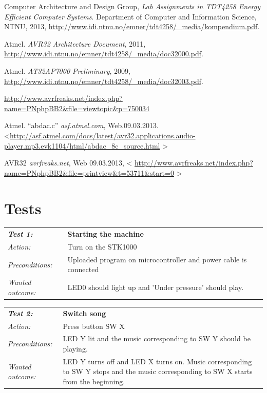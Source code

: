 \documentclass[a4paper,12pt]{article}
\begin{document}
\begin{thebibliography}{9}

Computer Architecture and Design Group,
\emph{Lab Assignments in TDT4258 Energy Efficient Computer Systems}.
Department of Computer and Information Science, NTNU,
2013,
\url{http://www.idi.ntnu.no/emner/tdt4258/\_media/kompendium.pdf}.

Atmel.
\emph{AVR32 Architecture Document},
2011,
\url{http://www.idi.ntnu.no/emner/tdt4258/\_media/doc32000.pdf}.

Atmel.
\emph{AT32AP7000 Preliminary},
2009,
\url{http://www.idi.ntnu.no/emner/tdt4258/\_media/doc32003.pdf}.

\url{http://www.avrfreaks.net/index.php?name=PNphpBB2&file=viewtopic&p=750034}

Atmel. “abdac.c”
\emph{asf.atmel.com},
Web.09.03.2013.
\textless \url{http://asf.atmel.com/docs/latest/avr32.applications.audio-player.mp3.evk1104/html/abdac_8c_source.html}
\textgreater

AVR32
\emph{avrfreaks.net},
Web 09.03.2013,
\textless
\url{http://www.avrfreaks.net/index.php?name=PNphpBB2&file=printview&t=53711&start=0}
\textgreater

\end{thebibliography}

\clearpage
\appendix
{}
\section{Tests}

\begin{tabular}[h]{|lp{12cm}|} \hline
\textbf{\emph{Test 1:}} 		& \textbf{Starting the machine}\\
\emph{Action:} 		& Turn on the STK1000\\
\emph{Preconditions:}	& Uploaded program on microcontroller and power cable is connected\\
\emph{Wanted outcome:}	& LED0 should light up and 'Under pressure' should play. \\ \hline
\end{tabular}
\vspace{1cm}

\begin{tabular}[h]{|lp{12cm}|} \hline
\textbf{\emph{Test 2:}} 		& \textbf{Switch song}\\
\emph{Action:} 		& Press button SW X\\
\emph{Preconditions:}	& LED Y lit and the music corresponding to SW Y should be playing.\\
\emph{Wanted outcome:}	& LED Y turns off and LED X turns on. Music corresponding to SW Y stops and the music corresponding to SW X starts from the beginning.\\ \hline
\end{tabular}
\vspace{1cm}
\end{document}
